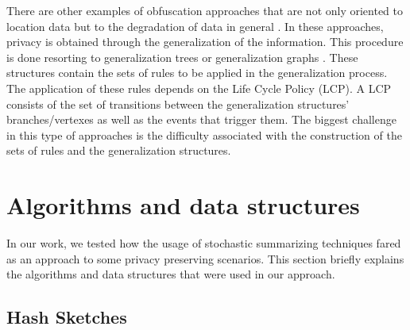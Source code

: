There are other examples of obfuscation approaches that are not only
oriented to location data but to the degradation of data in general
\cite{anciaux2008instantdb,heerde2006data}. In these approaches,
privacy is obtained through the generalization of the information.
This procedure is done resorting to generalization trees
\cite{anciaux2008instantdb} or generalization graphs
\cite{heerde2006data}. These structures contain the sets of rules to
be applied in the generalization process. The application of these
rules depends on the Life Cycle Policy (LCP). A LCP consists of the
set of transitions between the generalization structures'
branches/vertexes as well as the events that trigger them. The biggest
challenge in this type of approaches is the difficulty associated with 
the construction of the sets of rules and the generalization
structures.


\section{Algorithms and data structures}
\label{sec:algorithms_and_data_structures}
In our work, we tested how the usage of stochastic summarizing
techniques fared as an approach to some privacy preserving scenarios.
This section briefly explains the algorithms and data structures that
were used in our approach.

\subsection{Hash Sketches}
\label{sec:hash_sketches}

